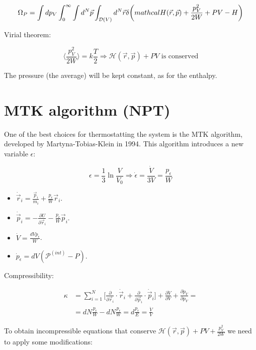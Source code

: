 	$$\Omega_P = \int dp_V\int_0^{\infty}\int d^N\vec{p}\int_{\mathcal{D}(V)}d^N\vec{r}\delta\biggl(\\mathcal{H}(\vec{r},\vec{p}) + \frac{p_V^2}{2W}+PV-H\biggr)$$

	Virial theorem:

	$$\biggl\langle\frac{p_V^2}{2W}\biggr\rangle = k\frac{T}{2}\Rightarrow \mathcal{H}(\vec{r},\vec{p}) + PV\text{ is conserved}$$

	The pressure (the average) will be kept constant, as for the enthalpy.

\section{MTK algorithm (NPT)}
One of the best choices for thermostatting the system is the MTK algorithm, developed by Martyna-Tobias-Klein in 1994.
This algorithm introduces a new variable $\epsilon$:

$$\epsilon = \frac{1}{3}\ln\frac{V}{V_0}\Rightarrow\dot{\epsilon} = \frac{\dot{V}}{3V}=\frac{p_\epsilon}{W}$$

\begin{multicols}{2}
	\begin{itemize}
		\item $\dot{\vec{r}}_i = \frac{\vec{p}_i}{m_i} + \frac{p_\epsilon}{W}\vec{r}_i$.
		\item $\dot{\vec{p}}_i = -\frac{\partial U}{\partial\vec{r}_i} - \frac{p_\epsilon}{W}\vec{p}_i$.
		\item $\dot{V} = \frac{dVp_\epsilon}{W}$.
		\item $\dot{p}_\epsilon = dV(\mathcal{P}^{(int)}-P)$.
	\end{itemize}
\end{multicols}


Compressibility:

\begin{align*}
	\kappa & = \sum\limits_{i=1}^N\biggl[\frac{\partial}{\partial\vec{r}_i}\cdot\dot{\vec{r}}_i + \frac{\partial}{\partial\vec{p}_i}\cdot\dot{\vec{p}}_i\biggr] + \frac{\partial\dot{V}}{\partial V} + \frac{\partial\dot{p}_V}{\partial p_V} = \\
				 &= dN\frac{p_\epsilon}{W}-dN\frac{p_\epsilon}{W} = d\frac{p_\epsilon}{E} = \frac{\dot{V}}{V}
\end{align*}

To obtain incompressible equations that conserve $\mathcal{H}(\vec{r},\vec{p}) + PV + \frac{p_V^2}{2W}$ we need to apply some modifications:

